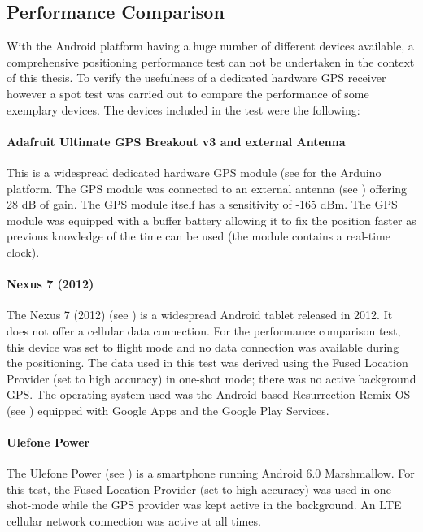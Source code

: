 \subsection{Performance Comparison}
With the Android platform having a huge number of different devices available, a comprehensive positioning performance test can not be undertaken in the context of this thesis. To verify the usefulness of a dedicated hardware GPS receiver however a spot test was carried out to compare the performance of some exemplary devices. The devices included in the test were the following:

\paragraph{Adafruit Ultimate GPS Breakout v3 and external Antenna}
This is a widespread dedicated hardware GPS module (see \cite{AdaGPS} for the Arduino platform. The GPS module was connected to an external antenna (see \cite{ExtAnt}) offering 28 dB of gain. The GPS module itself has a sensitivity of -165 dBm. The GPS module was equipped with a buffer battery allowing it to fix the position faster as previous knowledge of the time can be used (the module contains a real-time clock).

\paragraph{Nexus 7 (2012)}
The Nexus 7 (2012) (see \cite{Nexus7}) is a widespread Android tablet released in 2012. It does not offer a cellular data connection. For the performance comparison test, this device was set to flight mode and no data connection was available during the positioning. The data used in this test was derived using the Fused Location Provider (set to high accuracy) in one-shot mode; there was no active background GPS. The operating system used was the Android-based Resurrection Remix OS (see \cite{ResurOS}) equipped with Google Apps and the Google Play Services.

\paragraph{Ulefone Power}
The Ulefone Power (see \cite{UlePow}) is a smartphone running Android 6.0 Marshmallow. For this test, the Fused Location Provider (set to high accuracy) was used in one-shot-mode while the GPS provider was kept active in the background. An LTE cellular network connection was active at all times.

